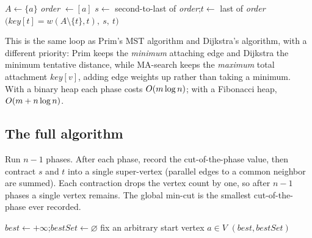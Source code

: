 \begin{algorithm}[H]
\caption{\textsc{MinimumCutPhase}$(\Gph,w,a)$ --- one MA-search}
\label{ch11:alg-phase}
\DontPrintSemicolon
{}
$A \gets \{a\}$\;
\textit{order} $\gets [a]$\;
$s\gets$ second-to-last of \textit{order};\quad $t\gets$ last of \textit{order}\;
\Return $\big(\textit{key}[t]=w(A\setminus\{t\},t),\ s,\ t\big)$\;
\end{algorithm}

This is the same loop as Prim's MST algorithm and Dijkstra's algorithm, with a different priority: Prim keeps the \emph{minimum} attaching edge and Dijkstra the minimum tentative distance, while MA-search keeps the \emph{maximum} total attachment $\textit{key}[v]$, adding edge weights up rather than taking a minimum. With a binary heap each phase costs $O(m\log n)$; with a Fibonacci heap, $O(m + n\log n)$.

\subsection{The full algorithm}

Run $n-1$ phases. After each phase, record the cut-of-the-phase value, then contract $s$ and $t$ into a single super-vertex (parallel edges to a common neighbor are summed). Each contraction drops the vertex count by one, so after $n-1$ phases a single vertex remains. The global min-cut is the smallest cut-of-the-phase ever recorded.

\begin{algorithm}[H]
\caption{\textsc{StoerWagner}$(\Gph,w)$}
\label{ch11:alg-sw}
\DontPrintSemicolon
{}
$\textit{best}\gets +\infty$;\quad $\textit{bestSet}\gets\varnothing$\;
fix an arbitrary start vertex $a\in V$\;
\Return $(\textit{best}, \textit{bestSet})$\;
\end{algorithm}

